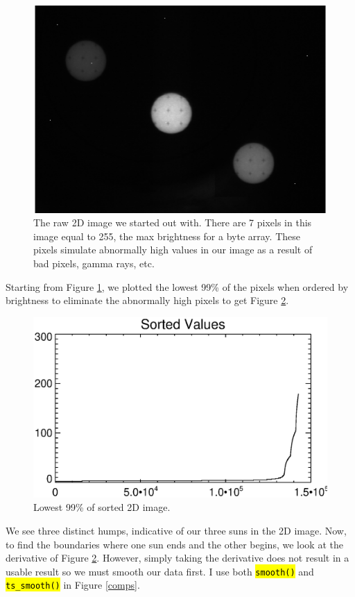 \documentclass[10pt]{article}
\begin{document}
\begin{figure}[!ht]
    \centering
    \includegraphics[width=.9\textwidth]{plots_tables_images/raw.eps}
    \caption{The raw 2D image we started out with. There are 7 pixels in this image equal to 255, the max brightness for a byte array. These pixels simulate abnormally high values in our image as a result of bad pixels, gamma rays, etc.}
    \label{raw}
\end{figure}

Starting from Figure \ref{raw}, we plotted the lowest 99\% of the pixels when ordered by brightness to eliminate the abnormally high pixels to get Figure \ref{sorted}.

\begin{figure}[!ht]
    \centering
    \includegraphics[width=.9\textwidth]{plots_tables_images/sorted_array.eps}
    \caption{Lowest 99\% of sorted 2D image.}
    \label{sorted}
\end{figure}

We see three distinct humps, indicative of our three suns in the 2D image. Now, to find the boundaries where one sun ends and the other begins, we look at the derivative of Figure \ref{sorted}. However, simply taking the derivative does not result in a usable result so we must smooth our data first. I use both \texttt{\hl{smooth()}} and \texttt{\hl{ts\_smooth()}} in Figure \ref{comps}.
\end{document}
